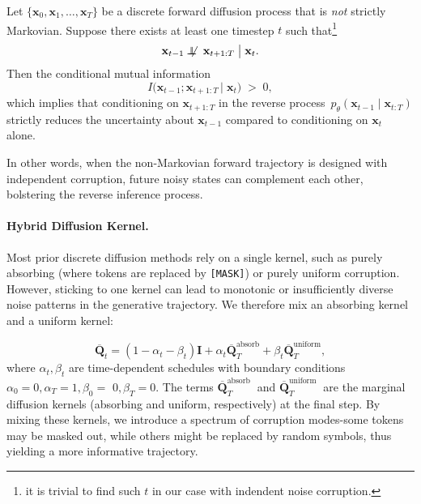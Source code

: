     \begin{proposition}
        \label{thm:non_markov_gain}
        Let \(\{\mathbf{x}_0,\mathbf{x}_1,\ldots,\mathbf{x}_T\}\) be a discrete forward diffusion process that is \emph{not} strictly Markovian.  Suppose there exists at least one timestep \(t\) such that\footnote{it is trivial to find such \(t\) in our case with indendent noise corruption.}
        \[
        \mathbf{x}_{t-1}
        \;\not\!\!\perp\!\!\!\!\perp\;
        \mathbf{x}_{t+1:T}
        \;\big|\;
        \mathbf{x}_t.
        \]
        Then the conditional mutual information 
        \[
        I\bigl(\mathbf{x}_{t-1}; \mathbf{x}_{t+1:T}\,\big|\;\mathbf{x}_t\bigr)
        \;>\; 0,
        \]
        which implies that conditioning on \(\mathbf{x}_{t+1:T}\) in the reverse process \(\,p_\theta(\mathbf{x}_{t-1}\mid \mathbf{x}_{t:T})\) strictly reduces the uncertainty about \(\mathbf{x}_{t-1}\) compared to conditioning on \(\mathbf{x}_t\) alone.
    \end{proposition}
In other words, when the non-Markovian forward trajectory is designed with independent corruption, future noisy states can complement each other, bolstering the reverse inference process.

\paragraph{Hybrid Diffusion Kernel.} Most prior discrete diffusion methods rely on a single kernel, such as purely absorbing (where tokens are replaced by \texttt{[MASK]}) or purely uniform corruption. However, sticking to one kernel can lead to monotonic or insufficiently diverse noise patterns in the generative trajectory. We therefore mix an absorbing kernel and a uniform kernel:

\begin{equation}
    \overline{\mathbf{Q}}_t = (1 -  \alpha_{t} -\beta_{t})\mathbf{I} 
    + \alpha_{t}\overline{\mathbf{Q}}_T^{\text{absorb}} 
    + \beta_{t}\overline{\mathbf{Q}}_T^{\text{uniform}},
\end{equation}
where $\alpha_t, \beta_t$ are time-dependent schedules with boundary conditions $\alpha_0=0, \alpha_T=1, \beta_0=$ $0, \beta_T=0$. The terms $\overline{\mathbf{Q}}_T^{\text {absorb }}$ and $\overline{\mathbf{Q}}_T^{\text {uniform }}$ are the marginal diffusion kernels (absorbing and uniform, respectively) at the final step. By mixing these kernels, we introduce a spectrum of corruption modes-some tokens may be masked out, while others might be replaced by random symbols, thus yielding a more informative trajectory. 

